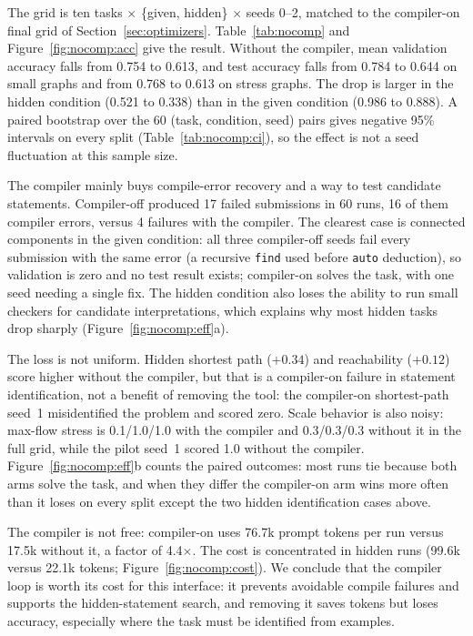 \documentclass[10pt]{article}
\begin{document}
The grid is ten tasks $\times$ \{given, hidden\} $\times$ seeds 0--2, matched to
the compiler-on final grid of Section~\ref{sec:optimizers}.
Table~\ref{tab:nocomp} and Figure~\ref{fig:nocomp:acc} give the result. Without
the compiler, mean validation accuracy falls from 0.754 to 0.613, and test
accuracy falls from 0.784 to 0.644 on small graphs and from 0.768 to 0.613 on
stress graphs. The drop is larger in the hidden condition (0.521 to 0.338) than
in the given condition (0.986 to 0.888). A paired bootstrap over the 60
(task, condition, seed) pairs gives negative 95\% intervals on every split
(Table~\ref{tab:nocomp:ci}), so the effect is not a seed fluctuation at this
sample size.

The compiler mainly buys compile-error recovery and a way to test candidate
statements. Compiler-off produced 17 failed submissions in 60 runs, 16 of them
compiler errors, versus 4 failures with the compiler. The clearest case is
connected components in the given condition: all three compiler-off seeds fail
every submission with the same error (a recursive \texttt{find} used before
\texttt{auto} deduction), so validation is zero and no test result exists;
compiler-on solves the task, with one seed needing a single fix. The hidden
condition also loses the ability to run small checkers for candidate
interpretations, which explains why most hidden tasks drop sharply
(Figure~\ref{fig:nocomp:eff}a).

The loss is not uniform. Hidden shortest path ($+0.34$) and reachability
($+0.12$) score higher without the compiler, but that is a compiler-on failure
in statement identification, not a benefit of removing the tool: the
compiler-on shortest-path seed~1 misidentified the problem and scored zero.
Scale behavior is also noisy: max-flow stress is 0.1/1.0/1.0 with the compiler
and 0.3/0.3/0.3 without it in the full grid, while the pilot seed~1 scored 1.0
without the compiler. Figure~\ref{fig:nocomp:eff}b counts the paired outcomes:
most runs tie because both arms solve the task, and when they differ the
compiler-on arm wins more often than it loses on every split except the two
hidden identification cases above.

The compiler is not free: compiler-on uses 76.7k prompt tokens per run versus
17.5k without it, a factor of 4.4$\times$. The cost is concentrated in hidden runs
(99.6k versus 22.1k tokens; Figure~\ref{fig:nocomp:cost}). We conclude that the
compiler loop is worth its cost for this interface: it prevents avoidable compile failures and supports the
hidden-statement search, and removing it saves tokens but loses accuracy,
especially where the task must be identified from examples.
\end{document}
